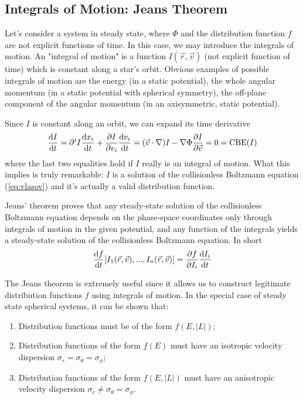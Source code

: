 \subsection{Integrals of Motion: Jeans Theorem}

Let’s consider a system in steady state, where $\Phi$ and the distribution function $f$ are not explicit functions of time. In this
case, we may introduce the integrals of motion. An "integral of motion" is a function $I(\vec{r}, \vec{v})$ (not explicit function of time) which is constant along a star's orbit. Obvious examples of possible integrals of motion are the energy (in a static potential), the whole angular momentum (in a static potential with spherical symmetry), the off-plane component of the angular momentum (in an axisymmetric, static potential).
\par Since $I$ is constant along an orbit, we can expand its time derivative
\begin{equation*}
    \frac{\text{d}I}{\text{d}t} = \partial^{i}I\frac{\text{d}x_{i}}{\text{d}t} + \frac{\partial I}{\partial v_{i}}\frac{\text{d}v_{i}}{\text{d}t} = (\vec{v}\cdot \nabla)I-\nabla\Phi\frac{\partial I}{\partial \vec{v}} = 0 = \text{CBE}(I)
\end{equation*}
where the last two equalities hold if $I$ really is an integral of motion. What this implies is truly remarkable: $I$ is a solution of the collisionless Boltzmann equation (\ref{eq:vlasov}) and it's actually a valid distribution function.
\par Jeans' theorem proves that any steady-state solution of the collisionless Boltzmann equation depends on the phase-space coordinates only through integrals of motion in the given potential, and any function of the integrals yields a steady-state solution of the collisionless Boltzmann equation. In short
\begin{equation}
    \frac{\text{d}f}{\text{d}t}[I_{1}(\vec{r},\vec{v}),...,I_{n}(\vec{r},\vec{v})] = \frac{\partial f}{\partial I_{i}}\frac{\text{d}I_{i}}{\text{d}t}
    \label{eq:jeanstheorem}
\end{equation}
\par The Jeans theorem is extremely useful since it allows us to construct legitimate distribution functions $f$ using integrals of motion. In the special case of steady state spherical systems, it can be shown that:
\begin{enumerate}
    \item Distribution functions must be of the form $f(E, |L|)$;
    \item Distribution functions of the form $f(E)$ must have an isotropic velocity dispersion $\sigma_{r} = \sigma_{\theta} = \sigma_{\phi}$;
    \item Distribution functions of the form $f(E, |L|)$ must have an anisotropic velocity dispersion $\sigma_{r} \neq \sigma_{\theta}=\sigma_{\phi}$.
\end{enumerate}
